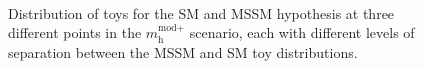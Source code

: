 \begin{figure}[h!]
\begin{center}
~\\
\end{center}
\caption{Distribution of toys for the SM and MSSM hypothesis at three different points in the $m_{\text{h}}^{\text{mod+}}$
scenario, each with different levels of separation between the MSSM and SM toy distributions.}
\label{fig:mssm_mssmvssm_toys}
\end{figure}



